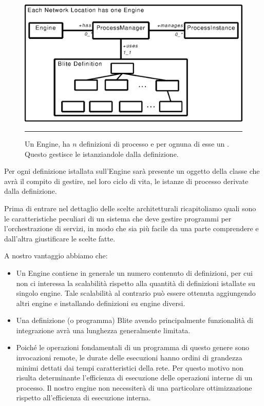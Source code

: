 \begin{figure}[th]
\begin{center}
  \includegraphics{architettura_interna/dia/engine}
  \caption[Blite-se: Engine, ProcessManager e ProcessInstace]{
  	Un Engine, ha $n$ definizioni di processo e per ognuna di esse un
  	. Questo gestisce le 
  	istanziandole dalla definizione.}
   \rule{7cm}{0.01cm}
  \label{fig:1}
\end{center}
\end{figure}

Per ogni definizione istallata sull'Engine sarà presente un oggetto 
della classe  che avrà il compito di gestire, nel loro
ciclo di vita, le istanze di processo derivate dalla definizione.

Prima di entrare nel dettaglio delle scelte architetturali ricapitoliamo quali
sono le caratteristiche peculiari di un sistema che deve gestire programmi per
l'orchestrazione di servizi, in modo che sia pi\`u facile da una parte
comprendere e dall'altra giustificare le scelte fatte.

A nostro vantaggio abbiamo che: \nopagebreak
\begin{itemize}
  \item Un Engine contiene in generale un numero contenuto di definizioni, per
  cui non ci interessa la scalabilità rispetto alla quantità di definizioni
  istallate su singolo engine. Tale scalabilità al contrario può essere
  ottenuta aggiungendo altri engine e installando definizioni su engine diversi.
  
  \item  Una definizione (o programma) Blite avendo principalmente funzionalità
  di integrazione avrà una lunghezza generalmente limitata. 
  
  \item Poiché le operazioni fondamentali di un programma di questo genere
  sono invocazioni remote, le durate delle esecuzioni hanno ordini di grandezza
  minimi dettati dai tempi caratteristici della rete. Per questo motivo non
  risulta determinante l'efficienza di esecuzione delle operazioni interne di un
  processo. Il nostro engine non necessiterà di una particolare ottimizzazione 
  rispetto all'efficienza di esecuzione interna.
\end{itemize}

